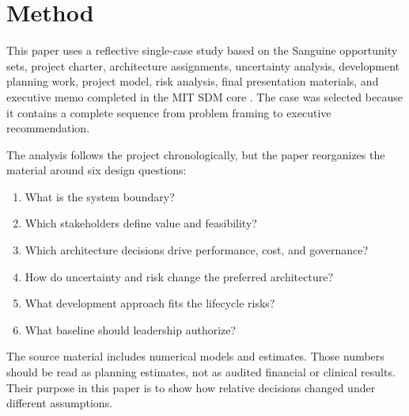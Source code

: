 \section{Method}

This paper uses a reflective single-case study based on the Sanguine opportunity sets, project charter, architecture assignments, uncertainty analysis, development planning work, project model, risk analysis, final presentation materials, and executive memo completed in the MIT SDM core \cite{sanguine_charter,sanguine_os9,sanguine_os11,sanguine_os13,sanguine_os14,sanguine_os15,sanguine_os16,sanguine_os17,sanguine_memo}. The case was selected because it contains a complete sequence from problem framing to executive recommendation.

The analysis follows the project chronologically, but the paper reorganizes the material around six design questions:

\begin{enumerate}
    \item What is the system boundary?
    \item Which stakeholders define value and feasibility?
    \item Which architecture decisions drive performance, cost, and governance?
    \item How do uncertainty and risk change the preferred architecture?
    \item What development approach fits the lifecycle risks?
    \item What baseline should leadership authorize?
\end{enumerate}

The source material includes numerical models and estimates. Those numbers should be read as planning estimates, not as audited financial or clinical results. Their purpose in this paper is to show how relative decisions changed under different assumptions.
